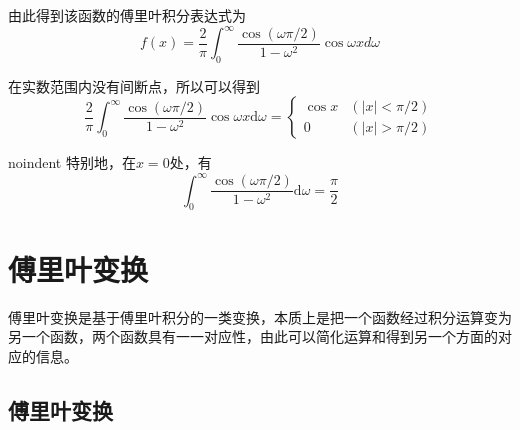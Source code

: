 \documentclass[UTF8,12pt]{ctexart}
\begin{document}
\noindent 由此得到该函数的傅里叶积分表达式为
\begin{equation}
	f(x)=\frac{2}{\pi} \int_{0}^{\infty} \frac{\cos (\omega \pi / 2)}{1-\omega^{2}} \cos \omega x d \omega
	\end{equation}

\noindent 在实数范围内没有间断点，所以可以得到
\begin{equation}
\frac{2}{\pi} \int_{0}^{\infty} \frac{\cos (\omega \pi / 2)}{1-\omega^{2}} \cos \omega x \mathrm{d} \omega=\left\{\begin{array}{ll}{\cos x} & {(|x|<\pi / 2)} \\ {0} & {(|x|>\pi / 2)}\end{array}\right.
\end{equation}

noindent 特别地，在$ x = 0 $处，有
\begin{equation}
	\int_{0}^{\infty} \frac{\cos (\omega \pi / 2)}{1-\omega^{2}} \mathrm{d} \omega=\frac{\pi}{2}
	\end{equation}


	\section{傅里叶变换}
	傅里叶变换是基于傅里叶积分的一类变换，本质上是把一个函数经过积分运算变为另一个函数，两个函数具有一一对应性，由此可以简化运算和得到另一个方面的对应的信息。
	
	\subsection{傅里叶变换}
\end{document}
